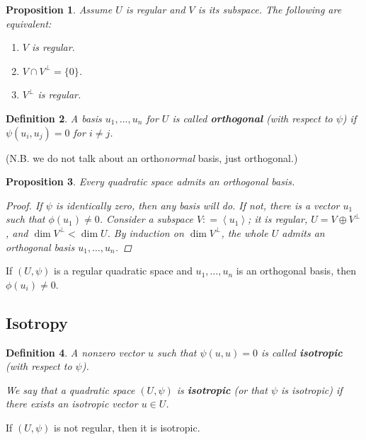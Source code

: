 \documentclass{article}
\newcommand{\term}{\textbf}
\newcommand{\dfn}{\mathrel{\mathop:}=}
\newcommand{\examplesymbol}{$\blacktriangle$}
\renewcommand{\qedsymbol}{$\blacksquare$}
\theoremstyle{myplain}
\newtheorem{proposition}{Proposition}[section]
\theoremstyle{mydefinition}
\newtheorem{definition}[proposition]{Definition}
\newenvironment{example}
  {\pushQED{\qed}\renewcommand{\qedsymbol}{\examplesymbol}\examplex}
  {\popQED\endexamplex}
\begin{document}
\begin{proposition}
  Assume $U$ is regular and $V$ is its subspace. The following are equivalent:
  \begin{enumerate}
  \item $V$ is regular.

  \item $V \cap V^\perp = \{ 0 \}$.

  \item $V^\perp$ is regular.
  \end{enumerate}
\end{proposition}

\begin{definition}
  A basis $u_1, \ldots, u_n$ for $U$ is called \term{orthogonal} (with respect
  to $\psi$) if $\psi (u_i, u_j) = 0$ for $i \ne j$.
\end{definition}

\noindent (N.B. we do not talk about an ortho\emph{normal} basis, just
orthogonal.)

\begin{proposition}
  Every quadratic space admits an orthogonal basis.

  \begin{proof}
    If $\psi$ is identically zero, then any basis will do. If not, there is a
    vector $u_1$ such that $\phi (u_1) \ne 0$. Consider a subspace
    $V \dfn \left<u_1\right>$; it is regular, $U = V \oplus V^\perp$, and
    $\dim V^\perp < \dim U$. By induction on $\dim V^\perp$, the whole $U$
    admits an orthogonal basis $u_1, \ldots, u_n$.
  \end{proof}
\end{proposition}

If $(U,\psi)$ is a regular quadratic space and $u_1, \ldots, u_n$ is an
orthogonal basis, then $\phi (u_i) \ne 0$.

\subsection*{Isotropy}

\begin{definition}
  A nonzero vector $u$ such that $\psi (u,u) = 0$ is called \term{isotropic}
  (with respect to $\psi$).

  We say that a quadratic space $(U,\psi)$ is \term{isotropic} (or that $\psi$
  is isotropic) if there exists an isotropic vector $u\in U$.
\end{definition}

\begin{example}
  If $(U,\psi)$ is not regular, then it is isotropic.
\end{example}
\end{document}
